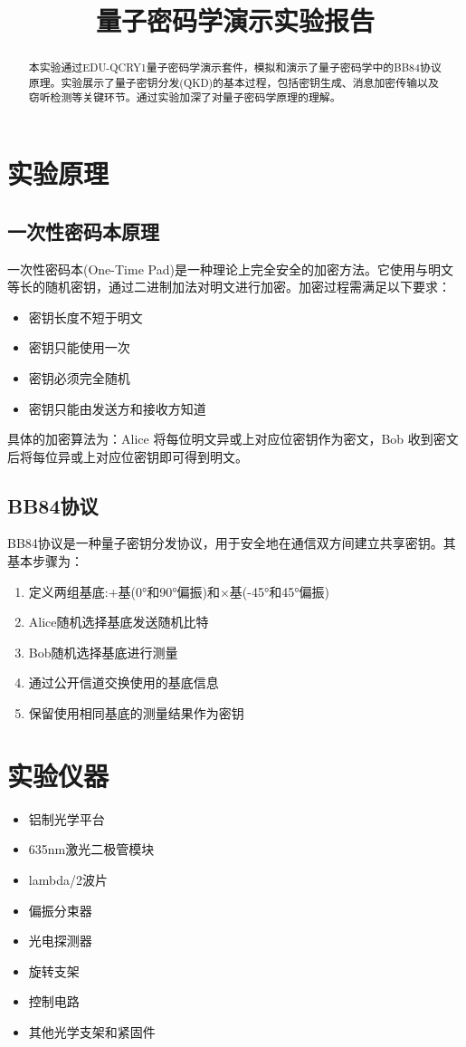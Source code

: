 \documentclass{ctexart}
\title{量子密码学演示实验报告}
\begin{document}
\maketitle

\begin{abstract}
本实验通过EDU-QCRY1量子密码学演示套件，模拟和演示了量子密码学中的BB84协议原理。实验展示了量子密钥分发(QKD)的基本过程，包括密钥生成、消息加密传输以及窃听检测等关键环节。通过实验加深了对量子密码学原理的理解。
\end{abstract}

\section{实验原理}
\subsection{一次性密码本原理}
一次性密码本(One-Time Pad)是一种理论上完全安全的加密方法。它使用与明文等长的随机密钥，通过二进制加法对明文进行加密。加密过程需满足以下要求：
\begin{itemize}
\item 密钥长度不短于明文
\item 密钥只能使用一次
\item 密钥必须完全随机
\item 密钥只能由发送方和接收方知道
\end{itemize}

具体的加密算法为：Alice 将每位明文异或上对应位密钥作为密文，Bob 收到密文后将每位异或上对应位密钥即可得到明文。
\subsection{BB84协议}
BB84协议是一种量子密钥分发协议，用于安全地在通信双方间建立共享密钥。其基本步骤为：
\begin{enumerate}
\item 定义两组基底:+基(0°和90°偏振)和×基(-45°和45°偏振)
\item Alice随机选择基底发送随机比特
\item Bob随机选择基底进行测量
\item 通过公开信道交换使用的基底信息
\item 保留使用相同基底的测量结果作为密钥
\end{enumerate}

\section{实验仪器}
\begin{itemize}
\item 铝制光学平台
\item 635nm激光二极管模块
\item lambda/2波片
\item 偏振分束器
\item 光电探测器
\item 旋转支架
\item 控制电路
\item 其他光学支架和紧固件
\end{itemize}
\end{document}
